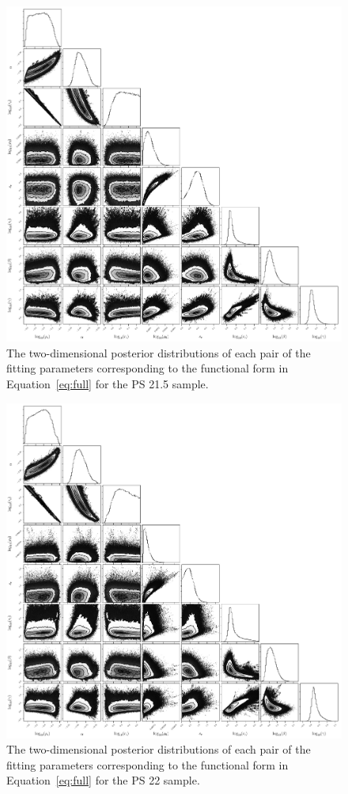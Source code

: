 \documentclass[iop, apjl, twocolappendix, numberedappendix]{emulateapj}
\begin{document}
\begin{figure}
    \includegraphics[width= \textwidth]{corner215.pdf}
\caption{The two-dimensional posterior distributions of each pair of
the fitting parameters corresponding to the functional
form in Equation~\ref{eq:full} for the PS 21.5 sample.
}
   \label{fig:corner_21.5} 
\end{figure}
\begin{figure}
    \includegraphics[width= \textwidth]{corner22.pdf}
\caption{The two-dimensional posterior distributions of each pair of
the fitting parameters corresponding to the functional form in
Equation~\ref{eq:full} for the PS 22 sample.}
   \label{fig:corner_22} 
\end{figure}
\end{document}
